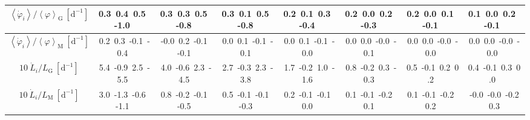 \begin{table}[H]
{\begin{centering}
\begin{tabular}{|c|c|c|c|c|c|c|c|}
$\left\langle \dot{\varphi}_{i}\right\rangle /\left\langle \varphi\right\rangle _{\mathrm{G}}\ \left[\mathrm{d^{-1}}\right]$ & \textcolor{C1}{0.3}\ \textcolor{C2}{0.4}\ \textcolor{C3}{0.5}\ \textcolor{C4}{-1.0}\  & \textcolor{C1}{0.3}\ \textcolor{C2}{0.3}\ \textcolor{C3}{0.5}\ \textcolor{C4}{-0.8}\  & \textcolor{C1}{0.3}\ \textcolor{C2}{0.1}\ \textcolor{C3}{0.5}\ \textcolor{C4}{-0.8}\  & \textcolor{C1}{0.2}\ \textcolor{C2}{0.1}\ \textcolor{C3}{0.3}\ \textcolor{C4}{-0.4}\  & \textcolor{C1}{0.2}\ \textcolor{C2}{0.0}\ \textcolor{C3}{0.2}\ \textcolor{C4}{-0.3}\  & \textcolor{C1}{0.2}\ \textcolor{C2}{0.0}\ \textcolor{C3}{0.1}\ \textcolor{C4}{-0.1}\  & \textcolor{C1}{0.1}\ \textcolor{C2}{0.0}\ \textcolor{C3}{0.2}\ \textcolor{C4}{-0.1}\  \tabularnewline
\hline
$\left\langle \dot{\varphi}_{i}\right\rangle /\left\langle \varphi\right\rangle _{\mathrm{M}}\ \left[\mathrm{d^{-1}}\right]$ & \textcolor{C1}{0.2}\ \textcolor{C2}{0.3}\ \textcolor{C3}{-0.1}\ \textcolor{C4}{-0.4}\  & \textcolor{C1}{-0.0}\ \textcolor{C2}{0.2}\ \textcolor{C3}{-0.1}\ \textcolor{C4}{-0.1}\  & \textcolor{C1}{0.0}\ \textcolor{C2}{0.1}\ \textcolor{C3}{-0.1}\ \textcolor{C4}{-0.1}\  & \textcolor{C1}{0.0}\ \textcolor{C2}{0.1}\ \textcolor{C3}{-0.1}\ \textcolor{C4}{-0.0}\  & \textcolor{C1}{0.0}\ \textcolor{C2}{0.0}\ \textcolor{C3}{-0.0}\ \textcolor{C4}{-0.1}\  & \textcolor{C1}{0.0}\ \textcolor{C2}{0.0}\ \textcolor{C3}{-0.0}\ \textcolor{C4}{-0.0}\  & \textcolor{C1}{0.0}\ \textcolor{C2}{0.0}\ \textcolor{C3}{-0.0}\ \textcolor{C4}{-0.0}\  \tabularnewline
\hline
$10\ \dot{L}_{i}/L_{\mathrm{G}}\ \left[\mathrm{d^{-1}}\right]$ & \textcolor{C1}{5.4}\ \textcolor{C2}{-0.9}\ \textcolor{C3}{2.5}\ \textcolor{C4}{-5.5}\  & \textcolor{C1}{4.0}\ \textcolor{C2}{-0.6}\ \textcolor{C3}{2.3}\ \textcolor{C4}{-4.5}\  & \textcolor{C1}{2.7}\ \textcolor{C2}{-0.3}\ \textcolor{C3}{2.3}\ \textcolor{C4}{-3.8}\  & \textcolor{C1}{1.7}\ \textcolor{C2}{-0.2}\ \textcolor{C3}{1.0}\ \textcolor{C4}{-1.6}\  & \textcolor{C1}{0.8}\ \textcolor{C2}{-0.2}\ \textcolor{C3}{0.3}\ \textcolor{C4}{-0.3}\  & \textcolor{C1}{0.5}\ \textcolor{C2}{-0.1}\ \textcolor{C3}{0.2}\ \textcolor{C4}{0.2}\  & \textcolor{C1}{0.4}\ \textcolor{C2}{-0.1}\ \textcolor{C3}{0.3}\ \textcolor{C4}{0.0}\  \tabularnewline
\hline
$10\ \dot{L}_{i}/L_{\mathrm{M}}\ \left[\mathrm{d^{-1}}\right]$ & \textcolor{C1}{3.0}\ \textcolor{C2}{-1.3}\ \textcolor{C3}{-0.6}\ \textcolor{C4}{-1.1}\  & \textcolor{C1}{0.8}\ \textcolor{C2}{-0.2}\ \textcolor{C3}{-0.1}\ \textcolor{C4}{-0.5}\  & \textcolor{C1}{0.5}\ \textcolor{C2}{-0.1}\ \textcolor{C3}{-0.1}\ \textcolor{C4}{-0.3}\  & \textcolor{C1}{0.2}\ \textcolor{C2}{-0.1}\ \textcolor{C3}{-0.1}\ \textcolor{C4}{0.0}\  & \textcolor{C1}{0.1}\ \textcolor{C2}{-0.1}\ \textcolor{C3}{-0.2}\ \textcolor{C4}{0.1}\  & \textcolor{C1}{0.1}\ \textcolor{C2}{-0.1}\ \textcolor{C3}{-0.2}\ \textcolor{C4}{0.2}\  & \textcolor{C1}{-0.0}\ \textcolor{C2}{-0.0}\ \textcolor{C3}{-0.2}\ \textcolor{C4}{0.3}\  \tabularnewline

\end{tabular}
\end{centering}}
\end{table}
